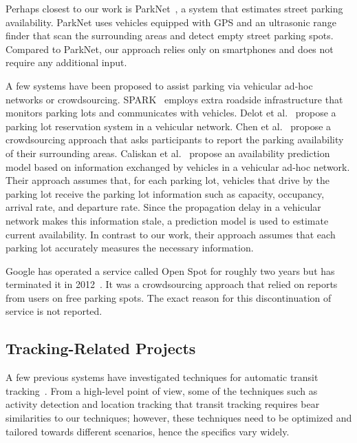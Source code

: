 Perhaps closest to our work is ParkNet~\cite{Mathur:2010:PDS}, a system that
estimates street parking availability. ParkNet uses vehicles equipped with GPS
and an ultrasonic range finder that scan the surrounding areas and detect
empty street parking spots. Compared to ParkNet, our approach relies only on
smartphones and does not require any additional input.

A few systems have been proposed to assist parking via vehicular ad-hoc networks
or crowdsourcing. SPARK~\cite{5062057} employs extra roadside infrastructure
that monitors parking lots and communicates with vehicles. Delot et
al.~\cite{Delot:2009:CRP} propose a parking lot reservation system in a
vehicular network. Chen et al.~\cite{Chen:2012:COS} propose a crowdsourcing
approach that asks participants to report the parking availability of their
surrounding areas. Caliskan et al.~\cite{4212497} propose an availability
prediction model based on information exchanged by vehicles in a vehicular
ad-hoc network. Their approach assumes that, for each parking lot, vehicles that
drive by the parking lot receive the parking lot information such as capacity,
occupancy, arrival rate, and departure rate. Since the propagation delay in a
vehicular network makes this information stale, a prediction model is used to
estimate current availability. In contrast to our work, their approach assumes
that each parking lot accurately measures the necessary information.

Google has operated a service called Open Spot for roughly two years but has
terminated it in 2012~\cite{open-spot}. It was a crowdsourcing approach that
relied on reports from users on free parking spots. The exact reason for this
discontinuation of service is not reported.

\subsection{Tracking-Related Projects}

A few previous systems have investigated techniques for automatic transit
tracking~\cite{Biagioni:2011:EAT, Thiagarajan:2010:CTT, Zhou:2012:LWP}. From a
high-level point of view, some of the techniques such as activity detection and
location tracking that transit tracking requires bear similarities to
our techniques; however, these techniques need to be optimized and tailored
towards different scenarios, hence the specifics vary widely.

